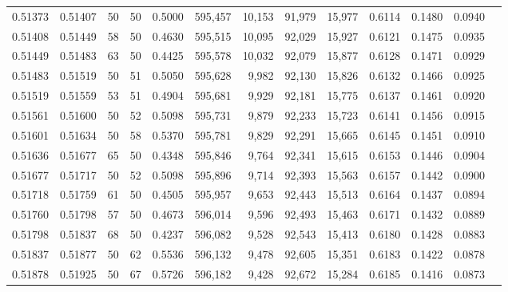 \begin{tabular}{rrrrrrrrrrrrr}
0.51373 & 0.51407 &    50 &  50 &                                     0.5000 & 595,457 &  10,153 &  91,979 &  15,977 & 0.6114 & 0.1480 & 0.0940 \\
0.51408 & 0.51449 &    58 &  50 &                                     0.4630 & 595,515 &  10,095 &  92,029 &  15,927 & 0.6121 & 0.1475 & 0.0935 \\
0.51449 & 0.51483 &    63 &  50 &                                     0.4425 & 595,578 &  10,032 &  92,079 &  15,877 & 0.6128 & 0.1471 & 0.0929 \\
0.51483 & 0.51519 &    50 &  51 &                                     0.5050 & 595,628 &   9,982 &  92,130 &  15,826 & 0.6132 & 0.1466 & 0.0925 \\
0.51519 & 0.51559 &    53 &  51 &                                     0.4904 & 595,681 &   9,929 &  92,181 &  15,775 & 0.6137 & 0.1461 & 0.0920 \\
0.51561 & 0.51600 &    50 &  52 &                                     0.5098 & 595,731 &   9,879 &  92,233 &  15,723 & 0.6141 & 0.1456 & 0.0915 \\
0.51601 & 0.51634 &    50 &  58 &                                     0.5370 & 595,781 &   9,829 &  92,291 &  15,665 & 0.6145 & 0.1451 & 0.0910 \\
0.51636 & 0.51677 &    65 &  50 &                                     0.4348 & 595,846 &   9,764 &  92,341 &  15,615 & 0.6153 & 0.1446 & 0.0904 \\
0.51677 & 0.51717 &    50 &  52 &                                     0.5098 & 595,896 &   9,714 &  92,393 &  15,563 & 0.6157 & 0.1442 & 0.0900 \\
0.51718 & 0.51759 &    61 &  50 &                                     0.4505 & 595,957 &   9,653 &  92,443 &  15,513 & 0.6164 & 0.1437 & 0.0894 \\
0.51760 & 0.51798 &    57 &  50 &                                     0.4673 & 596,014 &   9,596 &  92,493 &  15,463 & 0.6171 & 0.1432 & 0.0889 \\
0.51798 & 0.51837 &    68 &  50 &                                     0.4237 & 596,082 &   9,528 &  92,543 &  15,413 & 0.6180 & 0.1428 & 0.0883 \\
0.51837 & 0.51877 &    50 &  62 &                                     0.5536 & 596,132 &   9,478 &  92,605 &  15,351 & 0.6183 & 0.1422 & 0.0878 \\
0.51878 & 0.51925 &    50 &  67 &                                     0.5726 & 596,182 &   9,428 &  92,672 &  15,284 & 0.6185 & 0.1416 & 0.0873 \\

\end{tabular}
